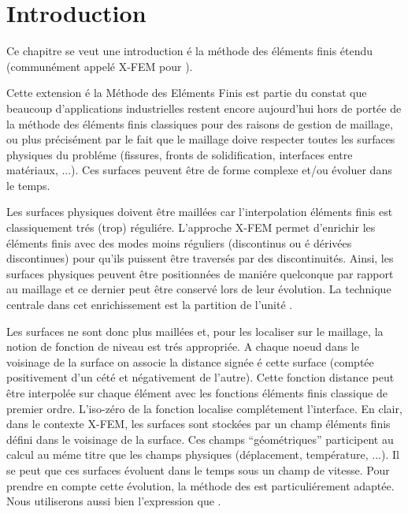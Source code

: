 
\section{Introduction}
Ce chapitre se veut une introduction
\'e la m\'ethode des \'el\'ements finis \'etendu (commun\'ement appel\'e X-FEM pour ).
                             
Cette extension \'e la M\'ethode des El\'ements Finis est partie du constat que beaucoup
d'applications industrielles restent encore aujourd'hui
hors de port\'ee de la
m\'ethode des \'el\'ements finis classiques pour des raisons
de gestion de maillage, ou plus pr\'ecis\'ement par le fait
que le maillage doive respecter toutes
les surfaces physiques du probl\'eme
(fissures, fronts de solidification, interfaces entre
mat\'eriaux, ...). Ces surfaces peuvent \^etre de forme
complexe et/ou \'evoluer dans le temps.

Les surfaces physiques doivent \^etre  maill\'ees  car
l'interpolation \'el\'ements finis est classiquement
tr\'es (trop) r\'eguli\'ere.
L'approche X-FEM permet d'enrichir les \'el\'ements finis avec des modes
moins r\'eguliers (discontinus ou \'e d\'eriv\'ees discontinues)
pour qu'ils puissent \^etre travers\'es par des discontinuit\'es.
Ainsi, les surfaces physiques peuvent \^etre positionn\'ees de mani\'ere
quelconque par rapport au maillage et ce dernier peut \^etre conserv\'e
lors de leur \'evolution. La technique centrale dans cet
enrichissement est la partition de l'unit\'e  \cite{Babuska:PUFEM}.

Les surfaces ne sont donc plus maill\'ees et, pour les localiser sur le
maillage, la notion de fonction de niveau est tr\'es appropri\'ee.
A chaque noeud dans le voisinage de la surface on associe la distance
sign\'ee \'e cette surface (compt\'ee positivement d'un c\'et\'e et
n\'egativement de l'autre).
Cette fonction distance peut \^etre interpol\'ee sur chaque \'el\'ement
avec les fonctions \'el\'ements finis classique de premier ordre.
L'iso-z\'ero de la fonction localise compl\'etement l'interface.
En clair, dans le contexte X-FEM, les surfaces sont stock\'ees par
un champ \'el\'ements finis d\'efini dans le voisinage de la surface.
Ces champs ``g\'eom\'etriques'' participent au calcul au m\'eme
titre que les champs physiques (d\'eplacement, temp\'erature, ...).
Il se peut que ces surfaces \'evoluent dans le temps sous
un champ de vitesse.
Pour prendre en compte cette \'evolution, la m\'ethode des
 \cite{Sethian:book} est particuli\'erement
adapt\'ee. Nous utiliserons aussi bien l'expression
 que .


